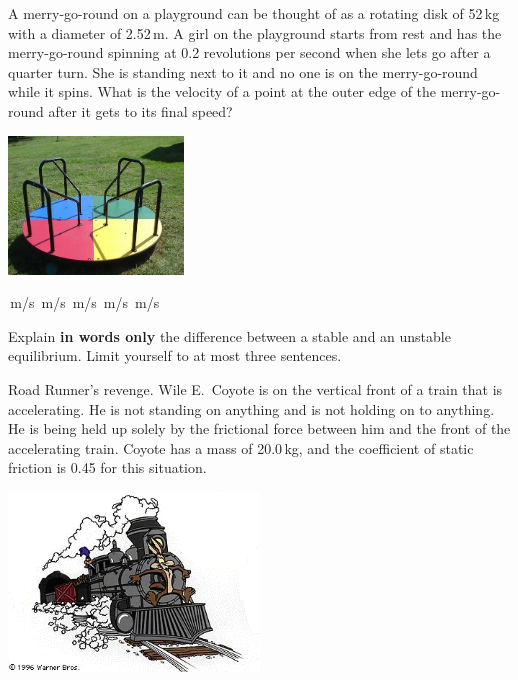 \documentclass[letterpaper,addpoints,answers]{exam}
\begin{document}
\begin{questions}
\pagebreak

\question[5]
A merry-go-round on a playground can be thought of as a rotating disk of 52\,kg with a diameter of 2.52\,m. A girl on the playground starts from rest and has the merry-go-round spinning at 0.2 revolutions per second when she lets go after a quarter turn. She is standing next to it and no one is on the merry-go-round while it spins. What is the velocity of a point at the outer edge of the merry-go-round after it gets to its final speed?
\begin{center}
 \includegraphics[width=0.35\textwidth]{final/merry_go_round}
\end{center}
\begin{checkboxes}
 \,m/s
 \,m/s
 \,m/s
 \,m/s
 \,m/s
\end{checkboxes}

\question[5]
Explain \textbf{in words only} the difference between a stable and an unstable equilibrium. Limit yourself to at most three sentences.

\pagebreak

\question
Road Runner's revenge.  Wile E.~Coyote is on the vertical front of a train that is accelerating. He is not standing on anything and is not holding on to anything. He is being held up solely by the frictional force between him and the front of the accelerating train. Coyote has a mass of 20.0\,kg, and the coefficient of static friction is 0.45 for this situation.

\begin{center}
 \includegraphics[width=0.5\textwidth]{final/train}
\end{center}


\end{questions}
\end{document}
